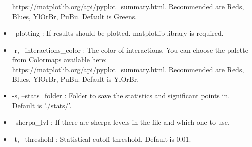 \begin{itemize}
    https://matplotlib.org/api/pyplot\_summary.html. Recommended are Reds, Blues, YlOrBr, PuBu. Default is Greens.
    \item --plotting : If results should be plotted. matplotlib library is required.
    \item -r, --interactions\_color : The color of interactions. You can choose the palette from Colormaps available
    here: https://matplotlib.org/api/pyplot\_summary.html. Recommended are Reds, Blues, YlOrBr, PuBu. Default is YlOrBr.
    \item -s, --stats\_folder : Folder to save the statistics and significant points in. Default is './stats/'.
    \item --sherpa\_lvl : If there are sherpa levels in the file and which one to use.
    \item -t, --threshold :  Statistical cutoff threshold. Default is 0.01.
\end{itemize}
